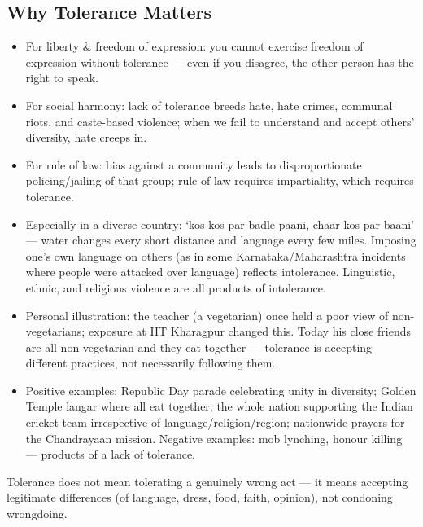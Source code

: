 \subsection{Why Tolerance Matters}

\begin{itemize}
\item For liberty \& freedom of expression: you cannot exercise freedom of expression without tolerance --- even if you disagree, the other person has the right to speak.
\item For social harmony: lack of tolerance breeds hate, hate crimes, communal riots, and caste-based violence; when we fail to understand and accept others' diversity, hate creeps in.
\item For rule of law: bias against a community leads to disproportionate policing/jailing of that group; rule of law requires impartiality, which requires tolerance.
\item Especially in a diverse country: `kos-kos par badle paani, chaar kos par baani' --- water changes every short distance and language every few miles. Imposing one's own language on others (as in some Karnataka/Maharashtra incidents where people were attacked over language) reflects intolerance. Linguistic, ethnic, and religious violence are all products of intolerance.
\end{itemize}

\begin{ExampleBox}
\begin{itemize}
\item Personal illustration: the teacher (a vegetarian) once held a poor view of non-vegetarians; exposure at IIT Kharagpur changed this. Today his close friends are all non-vegetarian and they eat together --- tolerance is accepting different practices, not necessarily following them.
\item Positive examples: Republic Day parade celebrating unity in diversity; Golden Temple langar where all eat together; the whole nation supporting the Indian cricket team irrespective of language/religion/region; nationwide prayers for the Chandrayaan mission. Negative examples: mob lynching, honour killing --- products of a lack of tolerance.
\end{itemize}
\end{ExampleBox}

\begin{CriticalPoint}
Tolerance does not mean tolerating a genuinely wrong act --- it means accepting legitimate differences (of language, dress, food, faith, opinion), not condoning wrongdoing.
\end{CriticalPoint}

